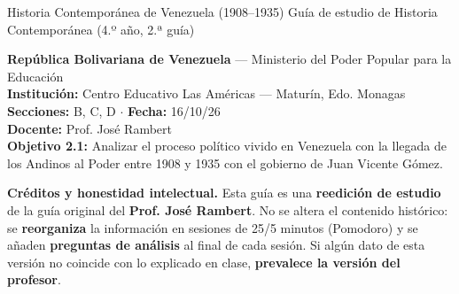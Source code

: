 \documentclass[12pt, letterpaper]{article}
\begin{document}

          {Historia Contemporánea de Venezuela (1908--1935)}
          {Guía de estudio de Historia Contemporánea (4.º año, 2.ª guía)}

\vspace{2pt}
\begin{cuadroinfo}
  \small
  \textbf{República Bolivariana de Venezuela} --- Ministerio del Poder Popular
  para la Educación \\[3pt]
  \textbf{Institución:} Centro Educativo Las Américas --- Maturín, Edo. Monagas
  \\[3pt]
  \textbf{Secciones:} B, C, D \quad$\cdot$\quad
  \textbf{Fecha:} 16/10/26 \\[3pt]
  \textbf{Docente:} Prof. José Rambert \\[3pt]
  \textbf{Objetivo 2.1:} Analizar el proceso político vivido en Venezuela con la
  llegada de los Andinos al Poder entre 1908 y 1935 con el gobierno de
  Juan Vicente Gómez.
\end{cuadroinfo}

\vspace{6pt}

\begin{cuadroadvertencia}
  \small
  \textbf{Créditos y honestidad intelectual.} Esta guía es una
  \textbf{reedición de estudio} de la guía original del
  \textbf{Prof. José Rambert}. No se altera el
  contenido histórico: se \textbf{reorganiza} la información en sesiones de
  25/5 minutos (Pomodoro) y se añaden \textbf{preguntas de análisis} al final de
  cada sesión. Si algún dato de esta versión no coincide con lo explicado en
  clase, \textbf{prevalece la versión del profesor}.
\end{cuadroadvertencia}
\end{document}
